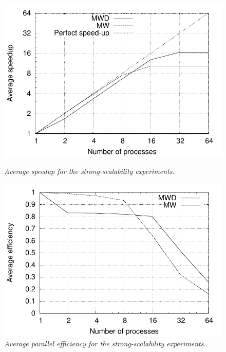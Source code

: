 \begin{figure}
\begin{minipage}[t]{0.48\textwidth}%
\centering

\includegraphics[width=1\columnwidth]{04-framework_design_and_implementation/img/strong_scaling-speedup_plot}

\caption{\textit{\emph{Average speedup for the strong-scalability experiments.
\label{fig:04-Strong_scalability_speedup}}}}
%
\end{minipage}\hfill{}%
\begin{minipage}[t]{0.48\textwidth}%
\centering

\includegraphics[width=1\columnwidth]{04-framework_design_and_implementation/img/strong_scaling-efficiency_plot}

\caption{\textit{\emph{Average parallel efficiency for the strong-scalability
experiments.}}\textit{ }\textit{\emph{\label{fig:04-Strong_scalability_efficiency}}}}
%
\end{minipage}
\end{figure}



